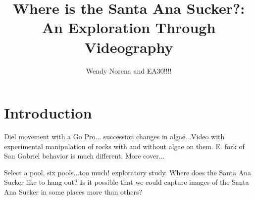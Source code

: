 \documentclass{tufte-handout}
\title{Where is the Santa Ana Sucker?: An Exploration Through Videography}
\author{Wendy Norena and EA30!!!!}
\begin{document}


\maketitle

\section{Introduction}


  Diel movement with a Go Pro... succession changes in algae...Video with experimental manipulation of rocks with and without algae on them. E. fork of San Gabriel behavior is much different. More cover...
  
  Select a pool, six pools...too much!  exploratory study.
Where does the Santa Ana Sucker like to hang out? Is it possible that we could capture images of the Santa Ana Sucker in some places more than others?
\end{document}
